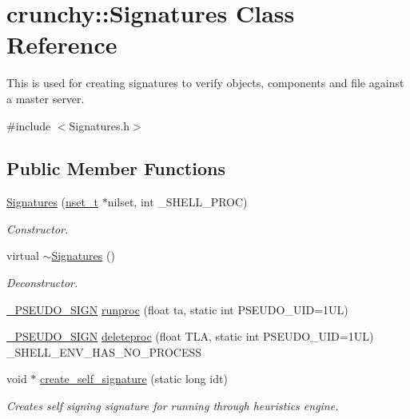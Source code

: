 \hypertarget{classcrunchy_1_1_signatures}{}\section{crunchy\+:\+:Signatures Class Reference}
\label{classcrunchy_1_1_signatures}


This is used for creating signatures to verify objects, components and file against a master server.  




{\ttfamily \#include $<$Signatures.\+h$>$}

\subsection*{Public Member Functions}
\begin{DoxyCompactItemize}
\item 
\hyperlink{classcrunchy_1_1_signatures_a953e432067bbec5ee40c6eecbcb106de}{Signatures} (\hyperlink{structcrunchy_1_1nset__t}{nset\+\_\+t} $\ast$nilset, int \+\_\+\+S\+H\+E\+L\+L\+\_\+\+P\+R\+O\+C)
\begin{DoxyCompactList}\small\item\em Constructor. \end{DoxyCompactList}\item 
virtual \hyperlink{classcrunchy_1_1_signatures_a1c96f7c33f3ed8cb6339eb406d9d3ca6}{$\sim$\+Signatures} ()
\begin{DoxyCompactList}\small\item\em Deconstructor. \end{DoxyCompactList}\item 
\hyperlink{_signatures_8h_a3f5aecd604689fdd466ced4997e5331e}{\+\_\+\+P\+S\+E\+U\+D\+O\+\_\+\+S\+I\+G\+N} \hyperlink{classcrunchy_1_1_signatures_af0273a4bbc0df1f36dbb43b396dc7dbf}{runproc} (float ta, static int P\+S\+E\+U\+D\+O\+\_\+\+U\+I\+D=1\+U\+L)
\item 
\hyperlink{_signatures_8h_a3f5aecd604689fdd466ced4997e5331e}{\+\_\+\+P\+S\+E\+U\+D\+O\+\_\+\+S\+I\+G\+N} \hyperlink{classcrunchy_1_1_signatures_a3eec9cfb4f8cf5fdbdf72769acf94a9c}{deleteproc} (float T\+L\+A, static int P\+S\+E\+U\+D\+O\+\_\+\+U\+I\+D=1\+U\+L) \+\_\+\+S\+H\+E\+L\+L\+\_\+\+E\+N\+V\+\_\+\+H\+A\+S\+\_\+\+N\+O\+\_\+\+P\+R\+O\+C\+E\+S\+S
\item 
void $\ast$ \hyperlink{classcrunchy_1_1_signatures_afefdc514b781bc498ae25612215c2678}{create\+\_\+self\+\_\+signature} (static long idt)
\begin{DoxyCompactList}\small\item\em Creates self signing signature for running through heuristics engine. \end{DoxyCompactList}\end{DoxyCompactItemize}


